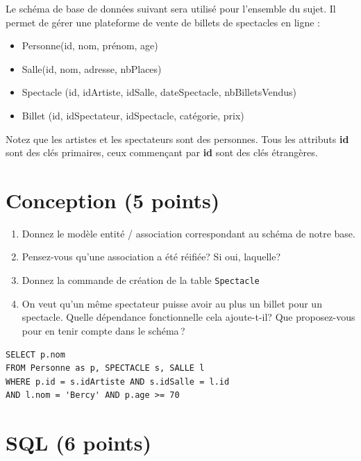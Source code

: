 

Le schéma de base de données suivant sera utilisé pour l'ensemble du
sujet. Il permet de gérer une plateforme de vente de billets de spectacles en ligne :

\begin{itemize}
  \item Personne(id, nom, prénom, age)
  \item Salle(id, nom, adresse, nbPlaces)
  \item Spectacle (id, idArtiste, idSalle, dateSpectacle, nbBilletsVendus)
   \item Billet (id, idSpectateur, idSpectacle, catégorie, prix)
\end{itemize}

Notez que les artistes et les spectateurs sont des personnes. Tous les attributs \textbf{id}
sont des clés primaires, ceux commençant par \textbf{id} sont des clés étrangères.

\section{Conception (5 points)}

\begin{enumerate}
    \item Donnez le modèle entité / association correspondant au schéma de notre base.
     \item Pensez-vous qu'une association a été réifiée? Si oui, laquelle?
     \item Donnez la commande de création de la table \texttt{Spectacle}
     \item On veut qu'un même spectateur puisse avoir au plus un billet pour un spectacle. 
        Quelle dépendance fonctionnelle cela ajoute-t-il? Que proposez-vous pour en tenir compte dans le schéma\,?
     
\end{enumerate}



\begin{solution}

\begin{verbatim}
SELECT p.nom
FROM Personne as p, SPECTACLE s, SALLE l
WHERE p.id = s.idArtiste AND s.idSalle = l.id 
AND l.nom = 'Bercy' AND p.age >= 70
\end{verbatim}
\end{solution}
\section{SQL  (6 points)}

